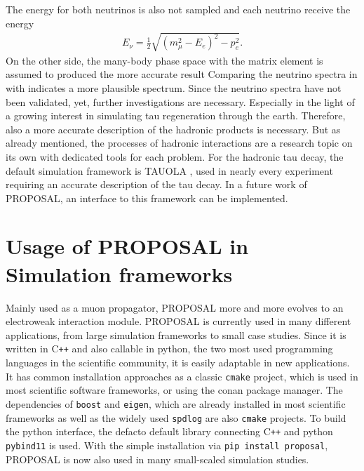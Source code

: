 The energy for both neutrinos is also not sampled and each neutrino receive the energy
\begin{align}
    E_\nu = \frac12 \sqrt{(m_\mu^2 - E_e)^2 - p_e^2} .
\end{align}
On the other side, the many-body phase space with the matrix element is assumed to produced the more accurate result
Comparing the neutrino spectra in  with  indicates a more plausible spectrum.
Since the neutrino spectra have not been validated, yet, further investigations are necessary.
Especially in the light of a growing interest in simulating tau regeneration through the earth.
Therefore, also a more accurate description of the hadronic products is necessary.
But as already mentioned, the processes of hadronic interactions are a research topic on its own with dedicated tools for each problem.
For the hadronic tau decay, the default simulation framework is TAUOLA \cite{Jadach91, Jadach93, Davidson12, Chrzaszcz16}, used in nearly every experiment requiring an accurate description of the tau decay.
In a future work of PROPOSAL, an interface to this framework can be implemented.

%
%

\section{Usage of PROPOSAL in Simulation frameworks}

Mainly used as a muon propagator, PROPOSAL more and more evolves to an electroweak interaction module.
PROPOSAL is currently used in many different applications, from large simulation frameworks to small case studies.
Since it is written in C\texttt{++} and also callable in python, the two most used programming languages in the scientific community, it is easily adaptable in new applications.
It has common installation approaches as a classic \texttt{cmake} project, which is used in most scientific software frameworks, or using the conan package manager.
The dependencies of \texttt{boost} and \texttt{eigen}, which are already installed in most scientific frameworks as well as the widely used \texttt{spdlog} are also \texttt{cmake} projects.
To build the python interface, the defacto default library connecting C\texttt{++} and python \texttt{pybind11} is used.
With the simple installation via \texttt{pip install proposal}, PROPOSAL is now also used in many small-scaled simulation studies.

